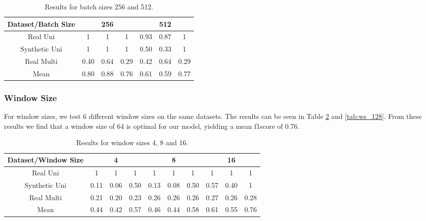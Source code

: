 \bgroup
\def\arraystretch{1.8}
\begin{table}[htbp]
\centering
\begin{tabular}{|c|c|c|c|c|c|c|}
\hline
Dataset/Batch Size & \multicolumn{3}{c|}{256} & \multicolumn{3}{c|}{512} \\ \hline
Real Uni           & 1      & 1      & 1      & 0.93   & 0.87   & 1      \\ \hline
Synthetic Uni      & 1      & 1      & 1      & 0.50   & 0.33   & 1      \\ \hline
Real Multi         & 0.40   & 0.64   & 0.29   & 0.42   & 0.64   & 0.29   \\ \hline
Mean               & 0.80   & 0.88   & 0.76   & 0.61   & 0.59   & 0.77   \\ \hline
\end{tabular}
\caption{Results for batch sizes 256 and 512.}
\label{tab:bs_512}
\end{table}
\egroup

\subsubsection{Window Size}
For window sizes, we test 6 different window sizes on the same datasets. The results can be seen in Table \ref{tab:ws_16} and \ref{tab:ws_128}. From these results we find that a window size of 64 is optimal for our model, yielding a mean \gls{f1score} of 0.76.

\bgroup
\def\arraystretch{1.8}
\begin{table}[htbp]
\centering
\begin{tabular}{|c|c|c|c|c|c|c|c|c|c|}
\hline
Dataset/Window Size              & \multicolumn{3}{c|}{4} & \multicolumn{3}{c|}{8} & \multicolumn{3}{c|}{16} \\ \hline
Real Uni      & 1      & 1     & 1     & 1      & 1     & 1     & 1      & 1      & 1     \\ \hline
Synthetic Uni & 0.11   & 0.06  & 0.50  & 0.13   & 0.08  & 0.50  & 0.57   & 0.40   & 1     \\ \hline
Real Multi    & 0.21   & 0.20  & 0.23  & 0.26   & 0.26  & 0.26  & 0.27   & 0.26   & 0.28  \\ \hline
Mean          & 0.44   & 0.42  & 0.57  & 0.46   & 0.44  & 0.58  & 0.61   & 0.55   & 0.76  \\ \hline
\end{tabular}
\caption{Results for window sizes 4, 8 and 16.}
\label{tab:ws_16}
\end{table}
\egroup

